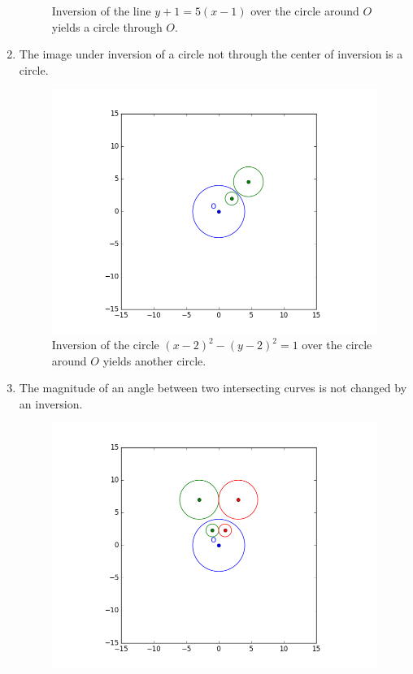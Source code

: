 \documentclass[a4paper,12pt]{article}
\numberwithin{figure}{section}
\begin{document}
\begin{enumerate}[leftmargin=25mm,label=\textbf{Theorem \arabic*:}]
\begin{figure}[H]
                \caption{Inversion of the line $y+1=5(x-1)$ over the circle around $O$ yields a circle through $O$.}
                \label{fig:loffcenter}
            \end{figure}
            \item The image under inversion of a circle not through the center of inversion is a circle.
            \begin{figure}[H]
                \centering
                \includegraphics[scale=0.6]{./pictures/INVERT_CIRCLE_OFFCENTER}
                \caption{Inversion of the circle $(x-2)^2-(y-2)^2=1$ over the circle around $O$ yields another circle.}
                \label{fig:coffcenter}
            \end{figure}
            \newpage
            \item The magnitude of an angle between two intersecting curves is not changed by an inversion.
            \begin{figure}[H]
                \centering
                \includegraphics[scale=0.6]{./pictures/INVERT_CIRCLE_ANGLE}

\end{figure}
\end{enumerate}
\end{document}
